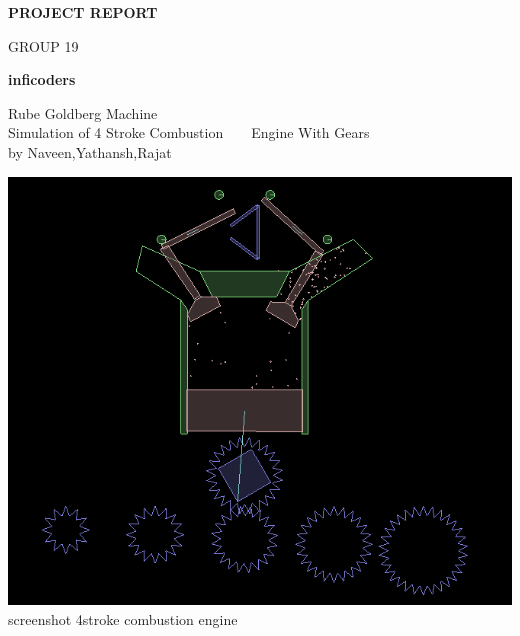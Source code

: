 \documentclass[40pt]{article}
\begin{document}
\bigskip
\begin{center}
\Huge{\textbf{
PROJECT REPORT}}
\end{center}

\begin{center}
\huge{GROUP 19}
\end{center}

\begin{center}
\Large{\textbf{inficoders}}

 
 \end{center}
 \bigskip
 \vspace{1cm}
 \bigskip
 \begin{center}
 \Large{Rube Goldberg Machine}
 \\
 \Large{Simulation of 4 Stroke Combustion ~\cite{ref1} ~\cite{ref10} Engine With Gears}
 \\
 \large{by Naveen,Yathansh,Rajat}
 \end{center}
 \bigskip
 \begin{center}
 \includegraphics[scale=0.4]{pic1.png}\newline
 \newline
 \small{screenshot 4stroke combustion engine}
 \end{center}
 
 
 
 
\newpage
\end{document}
